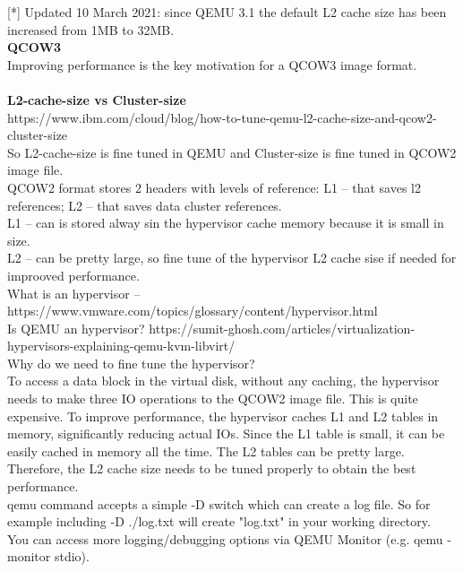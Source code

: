 \documentclass[11pt, a4paper, oneside]{article}
\theoremstyle{definition}
\begin{document}
[*] Updated 10 March 2021: since QEMU 3.1 the default L2 cache size has been increased from 1MB to 32MB. \\

\textbf{QCOW3}\\
Improving performance is the key motivation for a QCOW3 image format.\\
\\
\textbf{L2-cache-size vs Cluster-size}\\
https://www.ibm.com/cloud/blog/how-to-tune-qemu-l2-cache-size-and-qcow2-cluster-size\\

So L2-cache-size  is fine tuned in QEMU and Cluster-size is fine tuned in QCOW2 image file.\\
QCOW2 format stores 2 headers with levels of reference: L1 -- that saves l2 references; L2 -- that saves data cluster references.\\
L1 -- can is stored alway sin the hypervisor cache memory because it is small in size.\\
L2 -- can be pretty large, so fine tune of the hypervisor L2 cache sise if needed for improoved performance.\\

What is an hypervisor -- https://www.vmware.com/topics/glossary/content/hypervisor.html\\
Is QEMU an hypervisor? https://sumit-ghosh.com/articles/virtualization-hypervisors-explaining-qemu-kvm-libvirt/
\\
Why do we need to fine tune the hypervisor?\\
To access a data block in the virtual disk, without any caching, the hypervisor needs to make three IO operations to the QCOW2 image file. This is quite expensive. To improve performance, the hypervisor caches L1 and L2 tables in memory, significantly reducing actual IOs. Since the L1 table is small, it can be easily cached in memory all the time. The L2 tables can be pretty large. Therefore, the L2 cache size needs to be tuned properly to obtain the best performance.\\


qemu command accepts a simple -D switch which can create a log file. So for example including -D ./log.txt will create "log.txt" in your working directory.\\

You can access more logging/debugging options via QEMU Monitor (e.g. qemu -monitor stdio).\\
\end{document}
